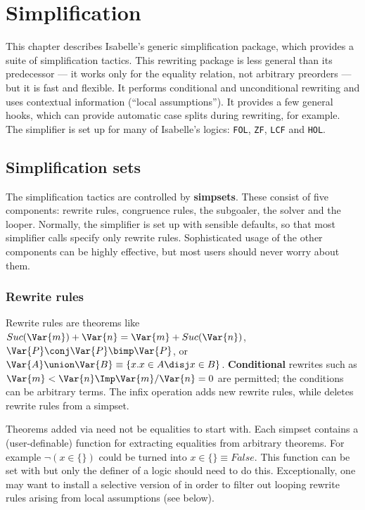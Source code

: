 \chapter{Simplification} \label{simp-chap}


This chapter describes Isabelle's generic simplification package, which
provides a suite of simplification tactics.  This rewriting package is less
general than its predecessor --- it works only for the equality relation,
not arbitrary preorders --- but it is fast and flexible.  It performs
conditional and unconditional rewriting and uses contextual information
(``local assumptions'').  It provides a few general hooks, which can
provide automatic case splits during rewriting, for example.  The
simplifier is set up for many of Isabelle's logics: {\tt FOL}, {\tt ZF},
{\tt LCF} and {\tt HOL}.


\section{Simplification sets}

The simplification tactics are controlled by {\bf simpsets}.  These consist
of five components: rewrite rules, congruence rules, the subgoaler, the
solver and the looper.  Normally, the simplifier is set up with sensible
defaults, so that most simplifier calls specify only rewrite rules.
Sophisticated usage of the other components can be highly effective, but
most users should never worry about them.

\subsection{Rewrite rules}

Rewrite rules are theorems like $Suc(\Var{m}) + \Var{n} = \Var{m} +
Suc(\Var{n})$, $\Var{P}\conj\Var{P} \bimp \Var{P}$, or $\Var{A} \union \Var{B}
\equiv \{x.x\in A \disj x\in B\}$.  {\bf Conditional} rewrites such as
$\Var{m}<\Var{n} \Imp \Var{m}/\Var{n} = 0$ are permitted; the conditions
can be arbitrary terms.  The infix operation  adds new
rewrite rules, while  deletes rewrite rules from a
simpset.

Theorems added via  need not be equalities to start with.
Each simpset contains a (user-definable) function for extracting equalities
from arbitrary theorems.  For example $\neg(x\in \{\})$ could be turned
into $x\in \{\} \equiv False$.  This function can be set with
 but only the definer of a logic should need to do
this.  Exceptionally, one may want to install a selective version of
 in order to filter out looping rewrite rules arising from
local assumptions (see below).


